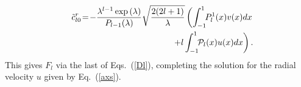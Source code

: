 \documentclass[aps,prx,twocolumn,amsmath,amssymb,amsfonts]{revtex4-2}
\begin{document}
{{\begin{appendices}
\begin{eqnarray}&&
{\tilde c}^{r}_{l0}\!=\!-
\frac{\lambda^{l-1}\exp\left(\lambda\right)}{P_{l-1}(\lambda)} \sqrt{\frac{2(2l+1)}{\lambda}}\left(\int_{-1}^1\!\!  P_l^1(x)  v(x) dx
\right.\nonumber\\&&\left.
+l \int_{-1}^1\!\!  {\cal P}_l(x)  u(x) dx\right).
\end{eqnarray}
This gives $F_l$ via the last of Eqs.~(\ref{Dl}), completing the solution for the radial velocity $u$ given by Eq.~(\ref{axs}).


\end{appendices}}}
\end{document}
